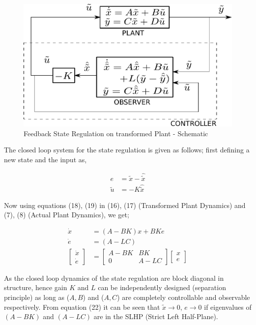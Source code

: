 \documentclass[11pt,usenames]{article}
\begin{document}
\begin{figure}[htpb]
	\centering
	\includegraphics[width=0.60\columnwidth]{LQRControllerFBStateRegulation_Image.pdf}
	\caption{ Feedback State Regulation on transformed Plant - Schematic }
	\label{fig:LQRControllerFBStateRegulation_Image}
\end{figure}

The closed loop system for the state regulation is given as follows; first defining a new state and the input as,

\begin{align} 
e&=\tilde{x}-\hat{\tilde{x}}\\ 
\tilde{u}&=-K\hat{\tilde{x}}
\end{align}

Now using equations (18), (19) in (16), (17) (Transformed Plant Dynamics) and (7), (8) (Actual Plant Dynamics), we get;

\begin{align} 
\dot{x}&=(A-BK)x+BKe\\
\dot{e}&=(A-LC)\\
\begin{bmatrix}
\dot{x}\\
\dot{e}
\end{bmatrix} &=
\begin{bmatrix}
A-BK & BK \\
0 & A-LC
\end{bmatrix}
\begin{bmatrix}
x\\
e
\end{bmatrix} 
\end{align}

As the closed loop dynamics of the state regulation are block diagonal in structure, hence gain $K$ and $L$ can be independently designed (separation principle) as long as ($A,B$) and ($A,C$) are completely controllable and observable respectively. From equation (22) it can be seen that $\tilde{x} \rightarrow 0$, $e \rightarrow 0$ if eigenvalues of $(A-BK)$ and $(A-LC)$ are in the SLHP (Strict Left Half-Plane).
\end{document}

